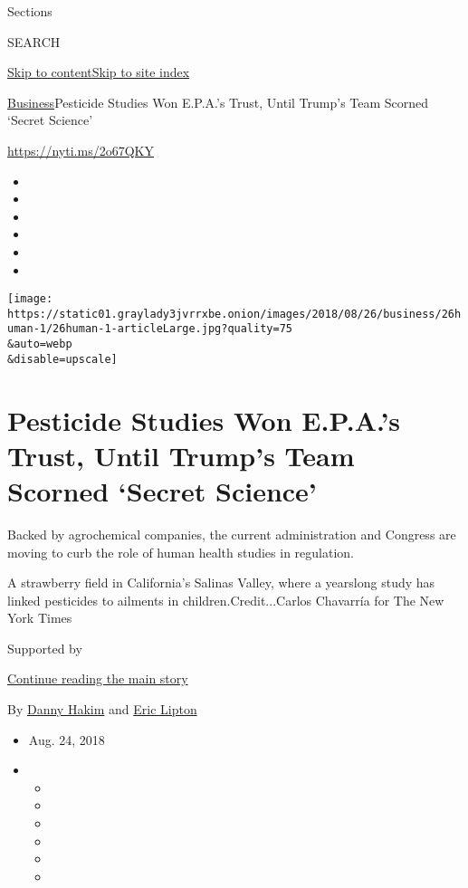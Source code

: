 Sections

SEARCH

\protect\hyperlink{site-content}{Skip to
content}\protect\hyperlink{site-index}{Skip to site index}

\href{/section/business}{Business}\textbar{}Pesticide Studies Won
E.P.A.'s Trust, Until Trump's Team Scorned `Secret Science'

\url{https://nyti.ms/2o67QKY}

\begin{itemize}
\item
\item
\item
\item
\item
\item
\end{itemize}

\texttt{[image: https://static01.graylady3jvrrxbe.onion/images/2018/08/26/business/26human-1/26human-1-articleLarge.jpg?quality=75\\\&auto=webp\\\&disable=upscale]}

\hypertarget{pesticide-studies-won-epas-trust-until-trumps-team-scorned-secret-science}{%
\section{Pesticide Studies Won E.P.A.'s Trust, Until Trump's Team
Scorned `Secret
Science'}\label{pesticide-studies-won-epas-trust-until-trumps-team-scorned-secret-science}}

Backed by agrochemical companies, the current administration and
Congress are moving to curb the role of human health studies in
regulation.

A strawberry field in California's Salinas Valley, where a yearslong
study has linked pesticides to ailments in children.Credit...Carlos
Chavarría for The New York Times

Supported by

\protect\hyperlink{after-sponsor}{Continue reading the main story}

By \href{https://www.nytimes3xbfgragh.onion/by/danny-hakim}{Danny Hakim}
and \href{https://www.nytimes3xbfgragh.onion/by/eric-lipton}{Eric
Lipton}

\begin{itemize}
\item
  Aug. 24, 2018
\item
  \begin{itemize}
  \item
  \item
  \item
  \item
  \item
  \item
  \end{itemize}
\end{itemize}

